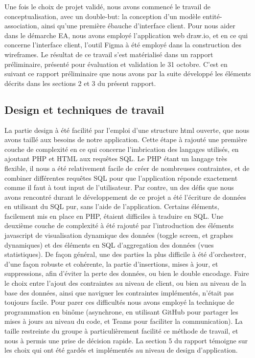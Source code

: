 \documentclass[a4paper,12pt]{article}
\begin{document}
Une fois le choix de projet validé, nous avons commencé le travail de conceptualisation, avec un double-but: la conception d'un modèle entité-association, ainsi qu'une première ébauche d'interface client. Pour nous aider dans le démarche EA, nous avons employé l'application web draw.io, et en ce qui concerne l'interface client, l'outil Figma à été employé dans la construction des wireframes. Le résultat de ce travail s'est matérialisé dans un rapport préliminaire, présenté pour évaluation et validation le 31 octobre. C'est en suivant ce rapport préliminaire  que nous avons par la suite développé les éléments décrits dans les sections 2 et 3 du présent rapport.
 
\subsection{Design et techniques de travail }

La partie design à été facilité par l'emploi d'une structure html ouverte, que nous avons taillé aux besoins de notre application. Cette étape à rajouté une première couche de complexité en ce qui concerne l'imbrication des langages utilisés, en ajoutant PHP et HTML aux requêtes SQL. Le PHP étant un langage très flexible, il nous a été relativement facile de créer de nombreuses contraintes, et de combiner différentes requêtes SQL pour que l'application réponde exactement comme il faut à tout input de l'utilisateur. 
Par contre, un des défis que nous avons rencontré durant le développement de ce projet a été l'écriture de données en utilisant du SQL pur, sans l'aide de l'application. Certains éléments, facilement mis en place en PHP, étaient difficiles à traduire en SQL.
Une deuxième couche de complexité à été rajouté par l'introduction des éléments javascript de visualisation dynamique des données (toggle screen, et graphes dynamiques) et des éléments en SQL d'aggregation des données (vues statistiques). De façon général, une des parties la plus difficile à été d'orchestrer, d'une façon robuste et cohérente, la partie d'insertions, mises à jour, et suppressions, afin d'éviter la perte des données, ou bien le double encodage. Faire le choix entre l'ajout des contraintes au niveau de client, ou bien au niveau de la base des données, ainsi que naviguer les contraintes implémentés, n'était pas toujours facile. Pour parer ces difficultés nous avons employé la technique de programmation en binôme (asynchrone, en utilisant GitHub pour partager les mises à jours au niveau du code, et Teams pour faciliter la communication). La taille restreinte du groupe à particulièrement facilité ce méthode de travail, et nous à permis une prise de décision rapide.
La section 5 du rapport témoigne sur les choix qui ont été gardés et implémentés au niveau de design d'application.
\end{document}
